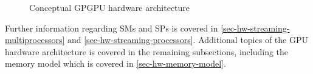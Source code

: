 \begin{figure}[ht]
	\centering
	\caption{Conceptual GPGPU hardware architecture}
	\label{fig:hw-gpu}
\end{figure}

Further information regarding SMs and SPs is covered in \cref{sec-hw-streaming-multiprocessors} and \cref{sec-hw-streaming-processors}.
Additional topics of the GPU hardware architecture is covered in the remaining subsections, including the memory model which is covered in \cref{sec-hw-memory-model}.
